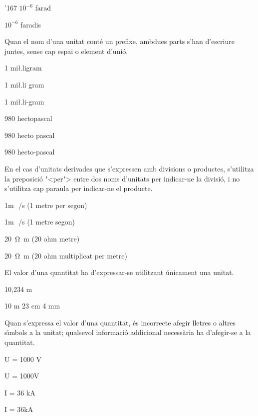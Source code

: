 \begin{dinglist}{'167}
\textcolor{Green}{} $10^{-6}$ farad

\textcolor{Red}{}  $10^{-6}$ faradis


 \item Quan el nom d'una unitat
cont\'{e} un prefixe, ambdues parts s'han d'escriure juntes, sense cap espai o element d'uni\'{o}.

\textcolor{Green}{} 1 mi{\l.l}igram

\textcolor{Red}{} 1 mi{\l.l}i gram

\textcolor{Red}{} 1 mi{\l.l}i-gram

\textcolor{Green}{}  980 hectopascal

\textcolor{Red}{} 980 hecto pascal

\textcolor{Red}{} 980 hecto-pascal


\item En el cas  d'unitats derivades que s'expressen amb divisions o
productes, s'utilitza la preposici\'{o} {"<}per{">} entre dos noms d'unitats
per indicar-ne la divisi\'{o}, i no s'utilitza cap paraula per indicar-ne el
producte.

\textcolor{Green}{} 1\unit{m\,/s} (1 metre per segon)

\textcolor{Red}{}  1\unit{m\,/s} (1 metre segon)

 \textcolor{Green}{} \SI{20}{\ohm.m} (20 ohm metre)

\textcolor{Red}{}   \SI{20}{\ohm.m} (20 ohm multiplicat per metre)


\item El valor d'una quantitat ha d'expressar-se  utilitzant \'{u}nicament una
unitat.

\textcolor{Green}{} 10,234 m

\textcolor{Red}{}  10 m 23 cm 4 mm


\item Quan s'expressa el valor d'una quantitat, \'{e}s incorrecte afegir
lletres o altres s\'{\i}mbols a la unitat; qualsevol informaci\'{o}
addicional necess\`{a}ria ha d'afegir-se a la quantitat.

\textcolor{Green}{} U = 1000 V

\textcolor{Red}{}  U = 1000\unit{V}

\textcolor{Green}{}  I = 36 kA

\textcolor{Red}{}   I = 36\unit{kA}



\end{dinglist}
